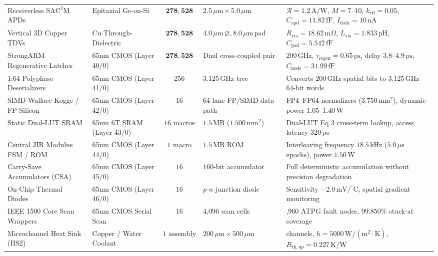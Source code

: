 \documentclass[journal]{IEEEtran}
\begin{document}
\begin{table}[!htbp]
\begin{tabularx}{\textwidth}{l l c l >{\raggedright\arraybackslash}X}
Receiverless $\mathrm{SAC^2M}$ APDs & Epitaxial Ge-on-Si & $\mathbf{278,528}$ & $2.5\,\mu\mathrm{m} \times 5.0\,\mu\mathrm{m}$ & $\mathcal{R} = 1.2\,\mathrm{A/W}$, $M=7\text{--}10$, $k_{\mathrm{eff}}=0.05$, $C_{\mathrm{apd}}=11.82\,\mathrm{fF}$, $I_{\mathrm{dark}}=10\,\mathrm{nA}$ \\
Vertical 3D Copper TDVs & Cu Through-Dielectric & $\mathbf{278,528}$ & $4.0\,\mu\mathrm{m}\,\varnothing, 8.0\,\mu\mathrm{m}\,\text{pad}$ & $R_{\mathrm{via}} = 18.62\,\mathrm{m}\Omega$, $L_{\mathrm{via}} = 1.833\,\mathrm{pH}$, $C_{\mathrm{pad}} = 5.542\,\mathrm{fF}$ \\
StrongARM Regenerative Latches & 65nm CMOS (Layer 40/0) & $\mathbf{278,528}$ & Dual cross-coupled pair & $200\,\mathrm{GHz}$, $\tau_{\mathrm{regen}} = 0.65\,\mathrm{ps}$, delay $3.8\text{--}4.9\,\mathrm{ps}$, $C_{\mathrm{node}} = 31.99\,\mathrm{fF}$ \\
1:64 Polyphase Deserializers & 65nm CMOS (Layer 41/0) & $256$ & $3.125\,\mathrm{GHz}$ tree & Converts $200\,\mathrm{GHz}$ spatial bits to $3.125\,\mathrm{GHz}$ 64-bit words \\
SIMD Wallace-Kogge / FP Silicon & 65nm CMOS (Layer 42/0) & $16$ & 64-lane FP/SIMD data path & FP4--FP64 normalizers ($3.750\,\mathrm{mm^2}$), dynamic power $1.05\text{--}1.40\,\mathrm{W}$ \\
Static Dual-LUT SRAM & 65nm 6T SRAM (Layer 43/0) & $16\text{ macros}$ & $1.5\,\mathrm{MB}$ ($1.500\,\mathrm{mm^2}$) & Dual-LUT Eq 3 cross-term lookup, access latency $320\,\mathrm{ps}$ \\
Central JIR Modulus FSM / ROM & 65nm CMOS (Layer 44/0) & $1\text{ macro}$ & $1.5\,\mathrm{MB}$ ROM & Interleaving frequency $18.5\,\mathrm{kHz}$ ($5.0\,\mu\mathrm{s}$ epochs), power $1.50\,\mathrm{W}$ \\
Carry-Save Accumulators (CSA) & 65nm CMOS (Layer 45/0) & $16$ & 160-bit accumulator & Full deterministic accumulation without precision degradation \\
On-Chip Thermal Diodes & 65nm CMOS (Layer 46/0) & $16$ & $p\text{-}n$ junction diode & Sensitivity $-2.0\,\mathrm{mV/^\circ C}$, spatial gradient monitoring \\
IEEE 1500 Core Scan Wrappers & 65nm CMOS Serial Scan & $16$ & 4,096 scan cells & 40,960 ATPG fault nodes, $99.850\%$ stuck-at coverage \\
Microchannel Heat Sink (HS2) & Copper / Water Coolant & $1\text{ assembly}$ & $200\,\mu\mathrm{m} \times 500\,\mu\mathrm{m}$ & 20 channels, $h = 5000\,\mathrm{W/(m^2\cdot K)}$, $R_{\mathrm{th,up}} = 0.227\,\mathrm{K/W}$ \\

\end{tabularx}
\end{table}
\end{document}

